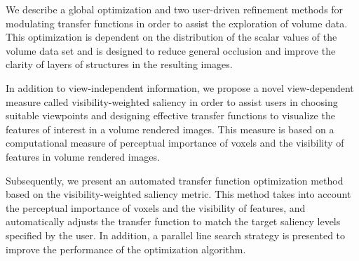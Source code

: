 \documentclass[a4paper, 12pt, twoside, openright]{report}         %
\begin{document}
\begin{thesisabstract}
We describe a global optimization and two user-driven refinement methods for modulating transfer functions in order to assist the exploration of volume data.
This optimization is dependent on the distribution of the scalar values of the volume data set and is designed to reduce general occlusion and improve the clarity of layers of structures in the resulting images.

In addition to view-independent information, %
we propose a novel view-dependent measure called visibility-weighted saliency in order to assist users in choosing suitable viewpoints and designing effective transfer functions to visualize the features of interest in a volume rendered images. This measure is based on a computational measure of perceptual importance of voxels and the visibility of features in volume rendered images.

Subsequently, we present an automated transfer function optimization method based on the visibility-weighted saliency metric. This method takes into account the perceptual importance of voxels and the visibility of features, and automatically adjusts the transfer function to match the target saliency levels specified by the user. In addition, a parallel line search strategy is presented to improve the performance of the optimization algorithm.


\end{thesisabstract}
\end{document}
